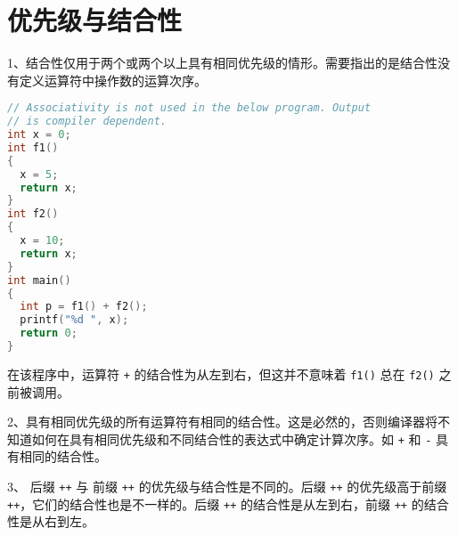 \section{优先级与结合性}

\begin{frame}[fragile]\ft{\secname}
  1、结合性仅用于两个或两个以上具有相同优先级的情形。需要指出的是结合性没有定义运算符中操作数的运算次序。
\end{frame}

\begin{frame}\ft{\secname}  
\begin{lstlisting}[language=c,backgroundcolor=\color{red!10}]
// Associativity is not used in the below program. Output 
// is compiler dependent.
int x = 0; 
int f1()
{
  x = 5;
  return x;
} 
int f2()
{
  x = 10;
  return x;
}
int main()
{
  int p = f1() + f2();
  printf("%d ", x);
  return 0;
}
\end{lstlisting}
\end{frame}

\begin{frame}[fragile]\ft{\secname}
  在该程序中，运算符 \lstinline|+| 的结合性为从左到右，但这并不意味着 \lstinline|f1()| 总在 \lstinline|f2()| 之前被调用。
\end{frame}

\begin{frame}[fragile]\ft{\secname}  
  2、具有相同优先级的所有运算符有相同的结合性。这是必然的，否则编译器将不知道如何在具有相同优先级和不同结合性的表达式中确定计算次序。如 \lstinline|+| 和 \lstinline|-| 具有相同的结合性。
\end{frame}

\begin{frame}[fragile]\ft{\secname}  
3、 后缀 \lstinline|++| 与 前缀 \lstinline|++| 的优先级与结合性是不同的。后缀 \lstinline|++| 的优先级高于前缀 \lstinline|++|，它们的结合性也是不一样的。后缀 \lstinline|++| 的结合性是从左到右，前缀 \lstinline|++| 的结合性是从右到左。
\end{frame}

